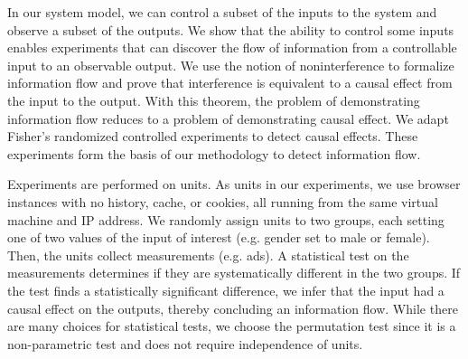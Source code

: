 \documentclass[10pt, onecolumn]{report}
\begin{document}



In our system model, we can control a subset of the inputs to the system 
and observe a subset of the outputs. We show that the
ability to control some inputs enables experiments that can discover 
the flow of information from a controllable input to an observable output. 
We use the notion of noninterference to formalize information flow
and prove that interference is equivalent to a 
causal effect from the input to the output. With this theorem, 
the problem of demonstrating information flow reduces to a problem 
of demonstrating causal effect. 
We adapt Fisher's randomized controlled experiments to detect causal effects. 
These experiments form the basis of our methodology to detect information flow. 

Experiments are performed on units.
As units in our experiments, we use browser instances with no history, 
cache, or cookies, all running from the same virtual machine and IP address. 
We randomly assign units to two groups, each setting one of two values of 
the input of interest (e.g. gender set to male or female). 
Then, the units collect measurements (e.g. ads). A statistical test
on the measurements determines if they are systematically different in the 
two groups. If the test finds a statistically significant difference, we
infer that the input had a causal effect on the outputs, thereby
concluding an information flow. 
While there are many choices for statistical tests, we choose the permutation 
test since it is a non-parametric test and does not require independence of units.
\end{document}
